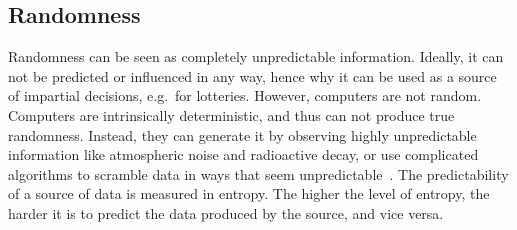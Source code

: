 \subsection{Randomness}
Randomness can be seen as completely unpredictable information. Ideally, it can not be predicted or influenced in any way, hence why it can be used as a source of impartial decisions, e.g.\ for lotteries.
However, computers are not random. Computers are intrinsically deterministic, and thus can not produce true randomness. Instead, they can generate it by observing highly unpredictable information like atmospheric noise and radioactive decay, or use complicated algorithms to scramble data in ways that seem unpredictable~\cite{randomsources}.
The predictability of a source of data is measured in entropy. The higher the level of entropy, the harder it is to predict the data produced by the source, and vice versa.
